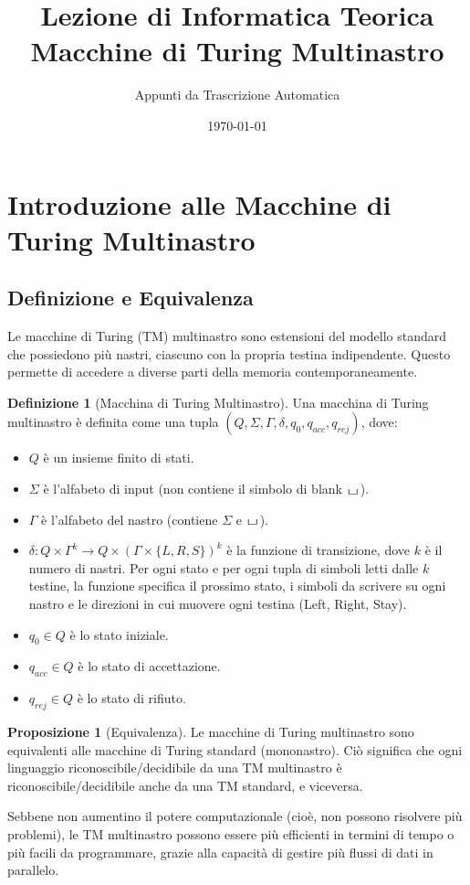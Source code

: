 \documentclass[a4paper]{article}
\title{Lezione di Informatica Teorica\\{\Large Macchine di Turing Multinastro}}
\author{Appunti da Trascrizione Automatica}
\date{\today}
\theoremstyle{definition} %
\newtheorem{definition}{Definizione}
\newtheorem{proposition}{Proposizione}
\newcommand{\blankS}{\ensuremath{\raisebox{-0.15ex}{\scalebox{1.3}[0.7]{$\sqcup$}}\mkern2mu}}
\begin{document}
\maketitle
\tableofcontents
\newpage

\section{Introduzione alle Macchine di Turing Multinastro}

\subsection{Definizione e Equivalenza}
Le macchine di Turing (TM) multinastro sono estensioni del modello standard che possiedono più nastri, ciascuno con la propria testina indipendente. Questo permette di accedere a diverse parti della memoria contemporaneamente.

\begin{definition}[Macchina di Turing Multinastro]
Una macchina di Turing multinastro è definita come una tupla $(Q, \Sigma, \Gamma, \delta, q_0, q_{acc}, q_{rej})$, dove:
\begin{itemize}
    \item $Q$ è un insieme finito di stati.
    \item $\Sigma$ è l'alfabeto di input (non contiene il simbolo di blank $\blankS$).
    \item $\Gamma$ è l'alfabeto del nastro (contiene $\Sigma$ e $\blankS$).
    \item $\delta: Q \times \Gamma^k \to Q \times (\Gamma \times \{L, R, S\})^k$ è la funzione di transizione, dove $k$ è il numero di nastri. Per ogni stato e per ogni tupla di simboli letti dalle $k$ testine, la funzione specifica il prossimo stato, i simboli da scrivere su ogni nastro e le direzioni in cui muovere ogni testina (Left, Right, Stay).
    \item $q_0 \in Q$ è lo stato iniziale.
    \item $q_{acc} \in Q$ è lo stato di accettazione.
    \item $q_{rej} \in Q$ è lo stato di rifiuto.
\end{itemize}
\end{definition}

\begin{proposition}[Equivalenza]
Le macchine di Turing multinastro sono equivalenti alle macchine di Turing standard (mononastro). Ciò significa che ogni linguaggio riconoscibile/decidibile da una TM multinastro è riconoscibile/decidibile anche da una TM standard, e viceversa.
\end{proposition}
Sebbene non aumentino il potere computazionale (cioè, non possono risolvere più problemi), le TM multinastro possono essere più efficienti in termini di tempo o più facili da programmare, grazie alla capacità di gestire più flussi di dati in parallelo.
\end{document}
